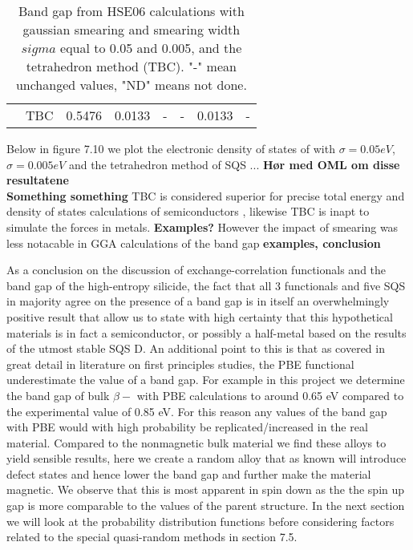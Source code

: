 \begin{landscape}
\begin{table}[]
\begin{tabular}{@{}cccccccc@{}}
\multicolumn{1}{c|}{}                            & TBC                                                           & 0.5476                                                                        & 0.0133                                                                        & -                                                                              & -                                                                              & 0.0133                                                                         & -                                                                                     \\ \cmidrule(l){2-8} 
\end{tabular}
\caption{Band gap from HSE06 calculations with gaussian smearing and smearing width  $sigma$ equal to 0.05 and 0.005, and the tetrahedron method (TBC). "-"  mean unchanged values, "ND" means not done.}
\end{table}
\end{landscape}
\newpage

Below in figure 7.10 we plot the electronic density of states of with $\sigma = 0.05 eV$, $\sigma = 0.005 eV$ and the tetrahedron method of SQS ... \textbf{Hør med OML om disse resultatene} \\

\textbf{Something something} TBC is considered superior for precise total energy and density of states calculations of semiconductors \cite{ismear}, likewise TBC is inapt to simulate the forces in metals. \textbf{Examples?} However the impact of smearing was less notacable in GGA calculations of the band gap \textbf{examples, conclusion}
 
As a conclusion on the discussion of exchange-correlation functionals and the band gap of the  high-entropy silicide, the fact that all 3 functionals and five SQS in majority agree on the presence of a band gap is in itself an overwhelmingly positive result that allow us to state with high certainty that this hypothetical materials is in fact a semiconductor, or possibly a half-metal based on the results of the utmost stable SQS D. An additional point to this is that as covered in great detail in literature on first principles studies, the PBE functional underestimate the value of a band gap. For example in this project we determine the band gap of bulk $\beta-$ with PBE calculations to around 0.65 eV compared to the experimental value of 0.85 eV. For this reason any values of the band gap with PBE would with high probability be replicated/increased in the real material. Compared to the nonmagnetic bulk material we find these alloys to yield sensible results, here we create a random alloy that as known will introduce defect states and hence lower the band gap and further make the material magnetic. We observe that this is most apparent in spin down as the the spin up gap is more comparable to the values of the parent  structure. In the next section we will look at the probability distribution functions before considering factors related to the special quasi-random methods in section 7.5. 


